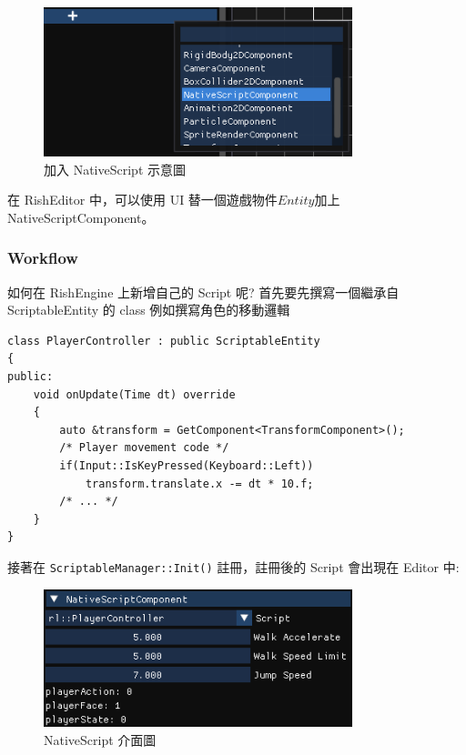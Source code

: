 \begin{figure}[h]
    \begin{center}
    \includegraphics[width=0.8\textwidth]{./resources/scriptable/selecte_nsc.png}
    \end{center}
\caption{加入 NativeScript 示意圖}
\end{figure}

在 RishEditor 中，可以使用 UI 替一個遊戲物件\(Entity\)加上 NativeScriptComponent。

\subsubsection{Workflow}

如何在 RishEngine 上新增自己的 Script 呢? 首先要先撰寫一個繼承自 ScriptableEntity 的 class 例如撰寫角色的移動邏輯

\begin{lstlisting}
class PlayerController : public ScriptableEntity
{
public:
    void onUpdate(Time dt) override
    {
        auto &transform = GetComponent<TransformComponent>();
        /* Player movement code */
        if(Input::IsKeyPressed(Keyboard::Left))
            transform.translate.x -= dt * 10.f;
        /* ... */
    }
}
\end{lstlisting}

接著在 \lstinline{ScriptableManager::Init()} 註冊，註冊後的 Script 會出現在 Editor 中:

\begin{figure}[h]
    \begin{center}
    \includegraphics[width=0.8\textwidth]{./resources/scriptable/nsc_veiw.png}
    \end{center}
\caption{NativeScript 介面圖}
\label{fig:RishEngineNativeScript}
\end{figure}

